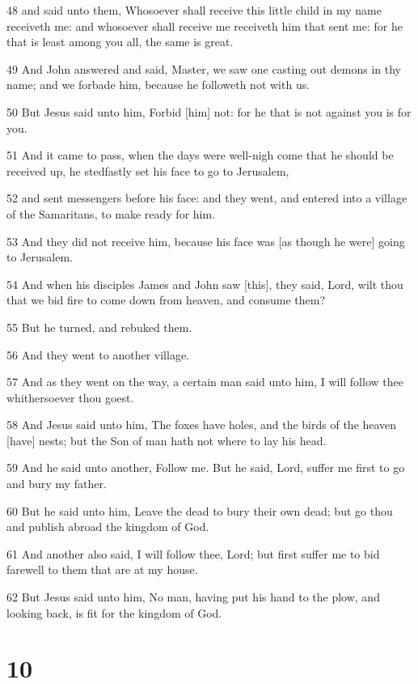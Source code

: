 \par 48 and said unto them, Whosoever shall receive this little child in my name receiveth me: and whosoever shall receive me receiveth him that sent me: for he that is least among you all, the same is great.
\par 49 And John answered and said, Master, we saw one casting out demons in thy name; and we forbade him, because he followeth not with us.
\par 50 But Jesus said unto him, Forbid [him] not: for he that is not against you is for you.
\par 51 And it came to pass, when the days were well-nigh come that he should be received up, he stedfastly set his face to go to Jerusalem,
\par 52 and sent messengers before his face: and they went, and entered into a village of the Samaritans, to make ready for him.
\par 53 And they did not receive him, because his face was [as though he were] going to Jerusalem.
\par 54 And when his disciples James and John saw [this], they said, Lord, wilt thou that we bid fire to come down from heaven, and consume them?
\par 55 But he turned, and rebuked them.
\par 56 And they went to another village.
\par 57 And as they went on the way, a certain man said unto him, I will follow thee whithersoever thou goest.
\par 58 And Jesus said unto him, The foxes have holes, and the birds of the heaven [have] nests; but the Son of man hath not where to lay his head.
\par 59 And he said unto another, Follow me. But he said, Lord, suffer me first to go and bury my father.
\par 60 But he said unto him, Leave the dead to bury their own dead; but go thou and publish abroad the kingdom of God.
\par 61 And another also said, I will follow thee, Lord; but first suffer me to bid farewell to them that are at my house.
\par 62 But Jesus said unto him, No man, having put his hand to the plow, and looking back, is fit for the kingdom of God.

\chapter{10}

